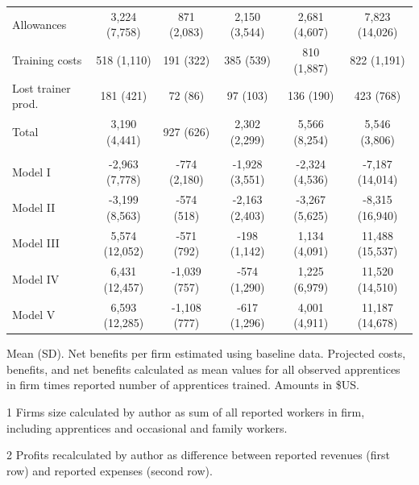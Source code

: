 \documentclass[
  11pt,
a4paper
]{report}
\begin{document}
\begin{table}[H]
{\begin{threeparttable}
\begin{tabular}[t]{lccccc}
\hspace{1em}Allowances & 3,224 (7,758) & 871 (2,083) & 2,150 (3,544) & 2,681 (4,607) & 7,823 (14,026)\\
\hspace{1em}Training costs & 518 (1,110) & 191 (322) & 385 (539) & 810 (1,887) & 822 (1,191)\\
\hspace{1em}Lost trainer prod. & 181 (421) & 72 (86) & 97 (103) & 136 (190) & 423 (768)\\
\hspace{1em}Total & 3,190 (4,441) & 927 (626) & 2,302 (2,299) & 5,566 (8,254) & 5,546 (3,806)\\
\addlinespace[0.3em]
\multicolumn{6}{l}{\textbf{Net benefits}}\\
\hspace{1em}Model I & -2,963 (7,778) & -774 (2,180) & -1,928 (3,551) & -2,324 (4,536) & -7,187 (14,014)\\
\hspace{1em}Model II & -3,199 (8,563) & -574 (518) & -2,163 (2,403) & -3,267 (5,625) & -8,315 (16,940)\\
\hspace{1em}Model III & 5,574 (12,052) & -571 (792) & -198 (1,142) & 1,134 (4,091) & 11,488 (15,537)\\
\hspace{1em}Model IV & 6,431 (12,457) & -1,039 (757) & -574 (1,290) & 1,225 (6,979) & 11,520 (14,510)\\
\hspace{1em}Model V & 6,593 (12,285) & -1,108 (777) & -617 (1,296) & 4,001 (4,911) & 11,187 (14,678)\\
\bottomrule
\end{tabular}
\begin{tablenotes}
\small
\item Mean (SD). Net benefits per firm estimated using baseline data. 
Projected costs, benefits, and net benefits calculated as mean values for all observed apprentices in 
firm times reported number of apprentices trained. Amounts in \$US.
\item[1] Firms size calculated by author as sum of all reported workers in firm, including apprentices and occasional and family workers.
\item[2] Profits recalculated by author as difference between reported revenues (first row) and reported expenses (second row).
\end{tablenotes}
\end{threeparttable}}
\end{table}
\end{document}

